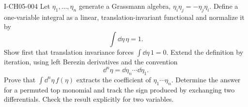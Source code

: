 \begin{exercise}{I-CH05-004}
Let $\eta_1,\ldots,\eta_n$ generate a Grassmann algebra,
$\eta_i\eta_j=-\eta_j\eta_i$.  Define a one-variable integral as a linear,
translation-invariant functional and normalize it by
\begin{equation*}
  \int\dd\eta\,\eta=1.
\end{equation*}
Show first that translation invariance forces
$\int\dd\eta\,1=0$.  Extend the definition by iteration, using left
Berezin derivatives and the convention
\begin{equation*}
  \dd^n\eta=\dd\eta_n\cdots\dd\eta_1.
\end{equation*}
Prove that $\int\dd^n\eta\,f(\eta)$ extracts the coefficient of
$\eta_1\cdots\eta_n$.  Determine the answer for a permuted top monomial and
track the sign produced by exchanging two differentials.  Check the result
explicitly for two variables.
\end{exercise}

